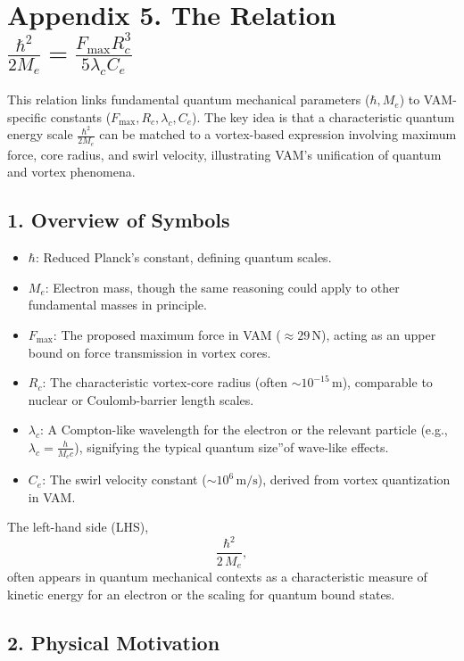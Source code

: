 

\section*{Appendix 5. The Relation \(\frac{\hbar^2}{2 M_e} = \frac{F_{\max} R_c^3}{5  \lambda_c  C_e} \)}

This relation links fundamental quantum mechanical parameters (\(\hbar, M_e\)) to VAM-specific constants (\(F_{\max}, R_c, \lambda_c, C_e\)). The key idea is that a characteristic quantum energy scale \(\tfrac{\hbar^2}{2M_e}\) can be matched to a vortex-based expression involving maximum force, core radius, and swirl velocity, illustrating VAM's unification of quantum and vortex phenomena.

\subsection*{1. Overview of Symbols}

\begin{itemize}
    \item \(\hbar\): Reduced Planck's constant, defining quantum scales.
    \item \(M_e\): Electron mass, though the same reasoning could apply to other fundamental masses in principle.
    \item \(F_{\max}\): The proposed maximum force in VAM (\(\approx 29\,\mathrm{N}\)), acting as an upper bound on force transmission in vortex cores.
    \item \(R_c\): The characteristic vortex-core radius (often \(\sim 10^{-15}\,\mathrm{m}\)), comparable to nuclear or Coulomb-barrier length scales.
    \item \(\lambda_c\): A Compton-like wavelength for the electron or the relevant particle (e.g., \(\lambda_c = \tfrac{h}{M_e c}\)), signifying the typical quantum \grqq size\textquotedblright of wave-like effects.
    \item \(C_e\): The swirl velocity constant (\(\sim 10^6\,\mathrm{m/s}\)), derived from vortex quantization in VAM.
\end{itemize}

The left-hand side (LHS),
\[
    \frac{\hbar^2}{2\,M_e},
\]
often appears in quantum mechanical contexts as a characteristic measure of kinetic energy for an electron or the scaling for quantum bound states.

\subsection*{2. Physical Motivation}

